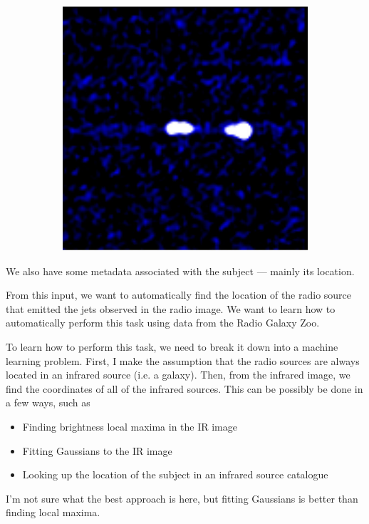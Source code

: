 \documentclass[a4paper]{article}
\begin{document}
\begin{figure}[!ht]
\begin{subfigure}{0.3\textwidth}
            \includegraphics[width=\linewidth]{images/ARG000180p_radio.jpg}
        \end{subfigure}
    \end{figure}

    We also have some metadata associated with the subject --- mainly its location.

    From this input, we want to automatically find the location of the radio source that emitted the jets observed in the radio image. We want to learn how to automatically perform this task using data from the Radio Galaxy Zoo.

    To learn how to perform this task, we need to break it down into a machine learning problem. First, I make the assumption that the radio sources are always located in an infrared source (i.e. a galaxy). Then, from the infrared image, we find the coordinates of all of the infrared sources. This can be possibly be done in a few ways, such as
    \begin{itemize}
        \item Finding brightness local maxima in the IR image
        \item Fitting Gaussians to the IR image
        \item Looking up the location of the subject in an infrared source catalogue
    \end{itemize}
    I'm not sure what the best approach is here, but fitting Gaussians is better than finding local maxima.
\end{document}
